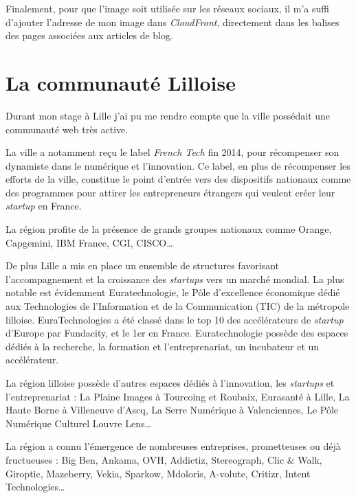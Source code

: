 \documentclass[12pt,a4paper]{article}
\begin{document}
  \bigskip

  Finalement, pour que l'image soit utilisée sur les réseaux sociaux, il
  m'a suffi d'ajouter l'adresse de mon image dans \emph{CloudFront},
  directement dans les balises des pages associées aux articles de blog.

  \newpage

  \section{La communauté Lilloise}\label{la-communautuxe9-lilloise}

  Durant mon stage à Lille j'ai pu me rendre compte que la ville possédait
  une communauté web très active.

  \bigskip

  La ville a notamment reçu le label \emph{French Tech} fin 2014, pour
  récompenser son dynamiste dans le numérique et l'innovation. Ce label,
  en plus de récompenser les efforts de la ville, constitue le point
  d'entrée vers des dispositifs nationaux comme des programmes pour
  attirer les entrepreneurs étrangers qui veulent créer leur
  \emph{startup} en France.

  \bigskip

  La région profite de la présence de grands groupes nationaux comme
  Orange, Capgemini, IBM France, CGI, CISCO\ldots{}

  \bigskip

  De plus Lille a mis en place un ensemble de structures favorisant
  l'accompagnement et la croissance des \emph{startups} vers un marché
  mondial. La plus notable est évidemment Euratechnologie, le Pôle
  d'excellence économique dédié aux Technologies de l'Information et de la
  Communication (TIC) de la métropole lilloise. EuraTechnologies a été
  classé dans le top 10 des accélérateurs de \emph{startup} d'Europe par
  Fundacity, et le 1er en France. Euratechnologie possède des espaces
  dédiés à la recherche, la formation et l'entreprenariat, un incubateur
  et un accélérateur.

  \bigskip

  La région lilloise possède d'autres espaces dédiés à l'innovation, les
  \emph{startups} et l'entreprenariat : La Plaine Images à Tourcoing et
  Roubaix, Eurasanté à Lille, La Haute Borne à Villeneuve d'Ascq, La Serre
  Numérique à Valenciennes, Le Pôle Numérique Culturel Louvre Lens\ldots{}

  \bigskip

  La région a connu l'émergence de nombreuses entreprises, prometteuses ou
  déjà fructueuses : Big Ben, Ankama, OVH, Addictiz, Stereograph, Clic \&
  Walk, Giroptic, Mazeberry, Vekia, Sparkow, Mdoloris, A-volute, Critizr,
  Intent Technologies\ldots{}
\end{document}
